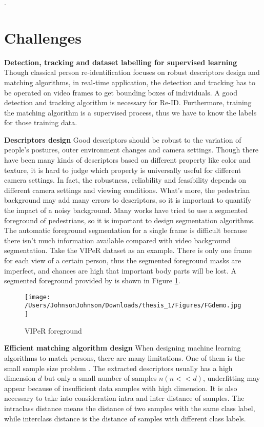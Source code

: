 .

\section{Challenges}

\textbf{Detection, tracking and dataset labelling for supervised learning} Though classical person re-identification focuses on robust descriptors design and matching algorithms, in real-time application, the detection and tracking has to be operated on video frames to get bounding boxes of individuals. A good detection and tracking algorithm is necessary for Re-ID. Furthermore, training the matching algorithm is a supervised process, thus we have to know the labels for those training data. 

\textbf{Descriptors design} Good descriptors should be robust to the variation of people's postures, outer environment changes and camera settings. Though there have been many kinds of descriptors based on different property like color and texture, it is hard to judge which property is universally useful for different camera settings. In fact, the robustness, reliability and feasibility depends on different camera settings and viewing conditions. What's more, the pedestrian background may add many errors to descriptors, so it is important to quantify the impact of a noisy background. Many works have tried to use a segmented foreground of pedestrians, so it is important to design segmentation algorithms. The automatic foreground segmentation for a single frame is difficult because there isn't much information available compared with video background segmentation. Take the VIPeR dataset as an example. There is only one frame for each view of a certain person, thus the segmented foreground masks are imperfect, and chances are high that important body parts will be lost. A segmented foreground provided by \cite{SDALF} is shown in Figure \ref{VIPeRFG}.
\begin{figure}[H]
\centering
\texttt{[image: /Users/JohnsonJohnson/Downloads/thesis\_1/Figures/FGdemo.jpg]}
\vspace{-3em}
\caption{VIPeR foreground}
\label{VIPeRFG}
\end{figure}

\textbf{Efficient matching algorithm design} 	
When designing machine learning algorithms to match persons, there are many limitations. One of them is the small sample size problem \cite{NFST}. The extracted descriptors usually has a high dimension $d$ but only a small number of samples $n(n<<d)$, underfitting may appear because of insufficient data samples with high dimension. It is also necessary to take into consideration intra and inter distance of samples. The intraclass distance means the distance of two samples with the same class label, while interclass distance is the distance of samples with different class labels. 

